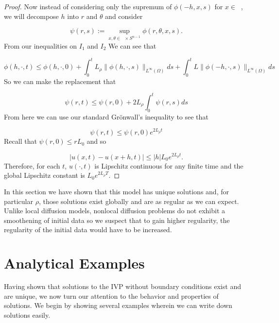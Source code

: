 \documentclass[aps,
preprint,
groupedaddress,
showkeys,
amsmath]{revtex4-2}
\DeclareMathOperator{\Rn}{\mathbb{R}^n}
\begin{document}
\begin{proof}
    Now instead of considering only the supremum of $\phi(-h,x,s)$ for $x\in \Rn$, we will decompose $h$ into $r$ and $\theta$ and consider 
    
   \[\psi(r,s):=\sup_{x,\theta\in \Rn\times S^{n-1}}\phi(r,\theta,x,s).\]
    From our inequalities on $I_1$ and $I_2$ We can see that 
    
   \[\phi(h,\cdot, t)\leq \phi(h,\cdot, 0)+\int_0^tL_\rho\|\phi(h,\cdot,s)\|_{L^\infty(\Omega)}ds+\int_0^tL\|\phi(-h,\cdot, s)\|_{L^\infty(\Omega)}ds\]
    So we can make the replacement that 
    
   \[\psi(r,t)\leq \psi(r,0)+2L_\rho\int_0^t\psi(r,s)ds\]
    From here we can use our standard Gr\"onwall's inequality to see that 
    
   \[\psi(r,t)\leq \psi(r,0)e^{2L_\rho t}\]
    Recall that $\psi(r,0)\leq rL_0$ and so 
    
   \[|u(x,t)-u(x+h,t)|\leq |h|L_0e^{2L_\rho t}.\] 
    Therefore, for each $t$, $u(\cdot, t)$ is Lipschitz continuous for any finite time and the global Lipschitz constant is $L_0e^{2L_\rho T}$.
    \end{proof}

    In this section we have shown that this model has unique solutions and, for particular $\rho$, those solutions exist globally and are as regular as we can expect. Unlike local diffusion models, nonlocal diffusion problems do not exhibit a smoothening of initial data so we suspect that to gain higher regularity, the regularity of the initial data would have to be increased.   
    
  \section{Analytical Examples}\label{SEC:AnalyticalExamples}
    Having shown that solutions to the IVP without boundary conditions exist and are unique, we now turn our attention to the behavior and properties of solutions. We begin by showing several examples wherein we can write down solutions easily.
    
\end{document}
